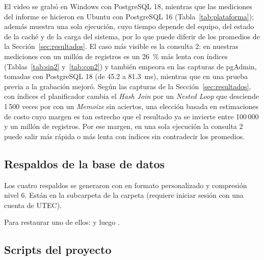 El video se grabó en Windows con PostgreSQL 18, mientras que las mediciones del informe se hicieron en Ubuntu con PostgreSQL 16 (Tabla~\ref{tab:plataforma}); además muestra una sola ejecución, cuyo tiempo depende del equipo, del estado de la caché y de la carga del sistema, por lo que puede diferir de los promedios de la Sección~\ref{sec:resultados}. El caso más visible es la consulta 2: en nuestras mediciones con un millón de registros es un 26~\% más lenta con índices (Tablas~\ref{tab:sin2} y~\ref{tab:con2}) y también empeora en las capturas de pgAdmin, tomadas con PostgreSQL 18 (de 45.2 a 81.3~ms), mientras que en una prueba previa a la grabación mejoró. Según las capturas de la Sección~\ref{sec:resultados}, con índices el planificador cambia el \emph{Hash Join} por un \emph{Nested Loop} que desciende 1\,500 veces por  con un \emph{Memoize} sin aciertos, una elección basada en estimaciones de costo cuyo margen es tan estrecho que el resultado ya se invierte entre 100\,000 y un millón de registros. Por ese margen, en una sola ejecución la consulta 2 puede salir más rápida o más lenta con índices sin contradecir los promedios.

\subsection{Respaldos de la base de datos}

Los cuatro respaldos se generaron con  en formato personalizado y compresión nivel 6. Están en la subcarpeta  de la carpeta \enlaceDumps{} (requiere iniciar sesión con una cuenta de UTEC).


Para restaurar uno de ellos:  y luego .

\subsection{Scripts del proyecto}

